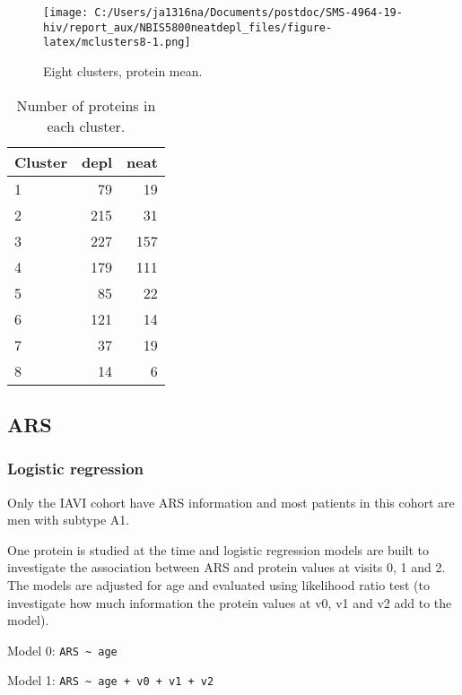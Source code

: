 \documentclass[
]{article}
\begin{document}
\begin{figure}
\centering
\texttt{[image: C:/Users/ja1316na/Documents/postdoc/SMS-4964-19-hiv/report\_aux/NBIS5800neatdepl\_files/figure-latex/mclusters8-1.png]}
\caption{\label{fig:mclusters8}Eight clusters, protein mean.}
\end{figure}

\FloatBarrier

\begin{table}

\caption{\label{tab:unnamed-chunk-21}Number of proteins in each cluster.}
\centering
\begin{tabular}[t]{l|r|r}
\hline
Cluster & depl & neat\\
\hline
1 & 79 & 19\\
\hline
2 & 215 & 31\\
\hline
3 & 227 & 157\\
\hline
4 & 179 & 111\\
\hline
5 & 85 & 22\\
\hline
6 & 121 & 14\\
\hline
7 & 37 & 19\\
\hline
8 & 14 & 6\\
\hline
\end{tabular}
\end{table}

\FloatBarrier

\hypertarget{ars}{%
\subsection{ARS}\label{ars}}

\hypertarget{logistic-regression}{%
\subsubsection{Logistic regression}\label{logistic-regression}}

Only the IAVI cohort have ARS information and most patients in this cohort are men with subtype A1.

One protein is studied at the time and logistic regression models are built to investigate the association between ARS and protein values at visits 0, 1 and 2. The models are adjusted for age and evaluated using likelihood ratio test (to investigate how much information the protein values at v0, v1 and v2 add to the model).

Model 0: \texttt{ARS\ \textasciitilde{}\ age}

Model 1: \texttt{ARS\ \textasciitilde{}\ age\ +\ v0\ +\ v1\ +\ v2}
\end{document}
